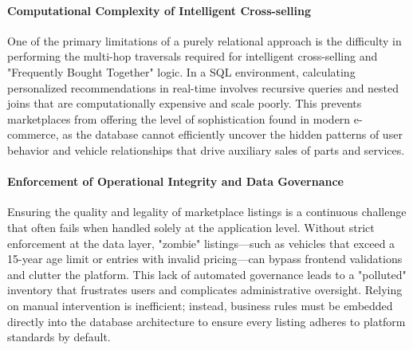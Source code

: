 \documentclass[12pt,a4paper]{report}
\begin{document}
\vspace{1em}

\paragraph{Computational Complexity of Intelligent Cross-selling} 
One of the primary limitations of a purely relational approach is the difficulty in performing the multi-hop traversals required for intelligent cross-selling and "Frequently Bought Together" logic. In a SQL environment, calculating personalized recommendations in real-time involves recursive queries and nested joins that are computationally expensive and scale poorly. This prevents marketplaces from offering the level of sophistication found in modern e-commerce, as the database cannot efficiently uncover the hidden patterns of user behavior and vehicle relationships that drive auxiliary sales of parts and services.

\vspace{1em}

\paragraph{Enforcement of Operational Integrity and Data Governance} 
Ensuring the quality and legality of marketplace listings is a continuous challenge that often fails when handled solely at the application level. Without strict enforcement at the data layer, "zombie" listings—such as vehicles that exceed a 15-year age limit or entries with invalid pricing—can bypass frontend validations and clutter the platform. This lack of automated governance leads to a "polluted" inventory that frustrates users and complicates administrative oversight. Relying on manual intervention is inefficient; instead, business rules must be embedded directly into the database architecture to ensure every listing adheres to platform standards by default.
\end{document}
